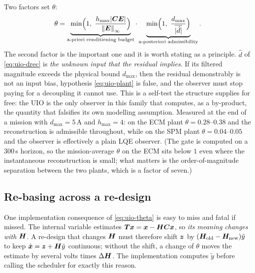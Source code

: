 Two factors set $\theta$:
\begin{equation}
\theta = \underbrace{\min\!\Big(1,\ \frac{h_{\max}|\mC\bm{E}|}{\norm{\bm{E}}_\infty}\Big)}
         _{\text{a-priori conditioning budget}}
        \cdot
         \underbrace{\min\!\Big(1,\ \frac{d_{\max}}{\;\overline{|\hat{d}|}\;}\Big)}
         _{\text{a-posteriori admissibility}} .
\label{eq:uio-gate}
\end{equation}
The second factor is the important one and it is worth stating as a principle.  $\hat{d}$ of
\eqref{eq:uio-drec} is \emph{the unknown input that the residual implies}.  If its filtered
magnitude exceeds the physical bound $d_{\max}$, then the residual demonstrably is not an input
bias, hypothesis \eqref{eq:uio-plant} is false, and the observer must stop paying for a decoupling
it cannot use.  This is a self-test the structure supplies for free: the UIO is the only observer
in this family that computes, as a by-product, the quantity that falsifies its own modelling
assumption.  Measured at the end of a mission with $d_{\max}=5$\,A and $h_{\max}=4$: on the ECM
plant $\theta = 0.28$--$0.38$ and the reconstruction is admissible throughout, while on the SPM
plant $\theta = 0.04$--$0.05$ and the observer is effectively a plain LQE observer.  (The gate is
computed on a $300$\,s horizon, so the mission-average $\theta$ on the ECM sits below $1$ even
where the instantaneous reconstruction is small; what matters is the order-of-magnitude
separation between the two plants, which is a factor of seven.)

\subsection{Re-basing across a re-design}
One implementation consequence of \eqref{eq:uio-theta} is easy to miss and fatal if missed.  The
internal variable estimates $\bm{T}\bm{x} = \bm{x} - \bm{H}\bm{C}\bm{x}$, so \emph{its meaning changes with}
$\bm{H}$.  A re-design that changes $\bm{H}$ must therefore shift $\bm{z}$ by
$(\bm{H}_{\text{old}} - \bm{H}_{\text{new}})\tilde{y}$ to keep $\hat{\bm{x}} = \bm{z} + \bm{H}\tilde{y}$ continuous;
without the shift, a change of $\theta$ moves the estimate by several volts times $\Delta\bm{H}$.
The implementation computes $\tilde{y}$ before calling the scheduler for exactly this reason.

